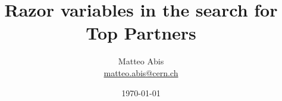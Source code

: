 \documentclass[ukenglish]{beamer}
\title[Razor for Top Partners]{Razor variables in the search for Top
Partners}
\author{Matteo Abis\\
\url{matteo.abis@cern.ch}}
\institute{Università di Padova and INFN}
\date{\today}
\begin{document}
\begin{frame}
  \titlepage
\end{frame}
 
\end{document}
